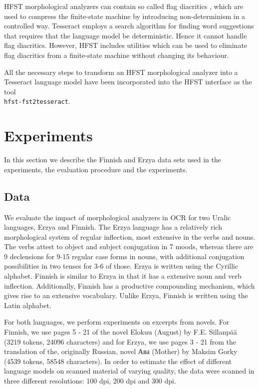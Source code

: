 \documentclass[b5paper]{article}
\begin{document}
HFST morphological analyzers can contain so called flag diacritics
\cite{beesley03}, which are used to compress the finite-state machine
by introducing non-determinism in a controlled way. Tesseract employs
a search algorithm for finding word suggestions that requires that
the language model be deterministic. Hence it cannot handle flag
diacritics. However, HFST includes utilities which can be used to
eliminate flag diacritics from a finite-state machine without
changing its behaviour.

All the necessary steps to transform an HFST morphological analyzer
into a Tesseract language model have been incorporated into the HFST
interface as the tool\\{\tt hfst-fst2tesseract}.

\section{Experiments}
\label{exp}

In this section we describe the Finnish and Erzya data sets used in
the experiments, the evaluation procedure and the experiments.

\subsection{Data}
We evaluate the impact of morphological analyzers in OCR for two
Uralic languages, Erzya and Finnish. 
The Erzya language has a relatively rich morphological system of
regular inflection, most extensive in the verbs and nouns. The verbs
attest to object and subject conjugation in 7 moods, whereas there are
9 declensions for 9-15 regular case forms in nouns, with additional
conjugation possibilities in two tenses for 3-6 of those. Erzya is
written using the Cyrillic alphabet.
Finnish is similar to Erzya in that it has a extensive noun and verb
inflection. Additionally, Finnish has a productive compounding
mechanism, which gives rise to an extensive vocabulary. Unlike Erzya,
Finnish is written using the Latin alphabet.

For both languages, we perform experiments on excerpts from novels.
For Finnish, we use pages 5 - 21 of the novel Elokuu (August) by
F.E. Sillanp\"{a}\"{a} \cite{sillanpaa08} (3219 tokens, 24096
characters) and for Erzya, we use pages 3 - 21 from the translation of
the, originally Russian, novel Ава (Mother) by Maksim Gorky \cite{gorki}
(4539 tokens, 58548 characters). In order to estimate the effect of
different language models on scanned material of varying quality, the
data were scanned in three different resolutions: 100 dpi, 200 dpi and
300 dpi.
\end{document}
